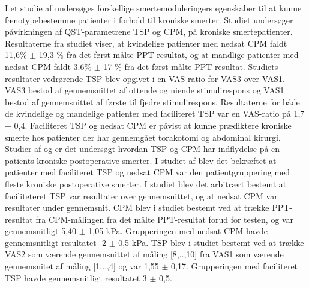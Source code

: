 I et studie af  undersøges forskellige smertemoduleringers egenskaber til at kunne fænotypebestemme patienter i forhold til kroniske smerter. Studiet undersøger påvirkningen af QST-parametrene TSP og CPM, på kroniske smertepatienter. Resultaterne fra studiet viser, at kvindelige patienter med nedsat CPM faldt 11,6\% $\pm$ 19,3 \% fra det først målte PPT-resultat, og at mandlige patienter med nedsat CPM faldt 3.6\% $\pm$ 17 \% fra det først målte PPT-resultat. Studiets resultater vedrørende TSP blev opgivet i en VAS ratio for VAS3 over VAS1. VAS3 bestod af gennemsnittet af ottende og niende stimulirespons og VAS1 bestod af gennemsnittet af  første til fjedre stimulirespons. Resultaterne for både de kvindelige og mandelige patienter med faciliteret TSP var en VAS-ratio på 1,7 $\pm$ 0,4. Faciliteret TSP og nedsat CPM er påvist at kunne prædiktere kroniske smerte hos patienter der har gennemgået torakotomi og abdominal kirurgi. \citep{Vaegter2016} \\
Studier af  og  er det undersøgt hvordan TSP og CPM har indflydelse på en patients kroniske postoperative smerter. I studiet af  blev det bekræftet at patienter med faciliteret TSP og nedsat CPM var den patientgruppering med fleste kroniske postoperative smerter. I studiet blev det arbitrært bestemt at faciliteteret TSP var resultater over gennemsnittet, og at nedsat CPM var resultater under gennemsnit. CPM blev i studiet bestemt ved at trække PPT-resultat fra CPM-målingen fra det målte PPT-resultat forud for testen, og var gennemsnitligt 5,40 $\pm$ 1,05 kPa. Grupperingen med nedsat CPM havde gennemsnitligt resultatet -2 $\pm$ 0,5 kPa. TSP blev i studiet bestemt ved at trække VAS2 som værende gennemsnittet af måling [8,..,10] fra VAS1 som værende gennemsnitet af måling [1,..,4] og var 1,55 $\pm$ 0,17. Grupperingen med faciliteret TSP havde gennemsnitligt resultatet 3 $\pm$ 0,5. 

\begin{table}[H]
	\centering
	\caption{I tabellen ses resultaterne vedrørende CPM og TSP målinger på gruppering med nedsat CPM og faciliteret TSP.}
	\label{tab:CPM_TSP}
\end{table}

